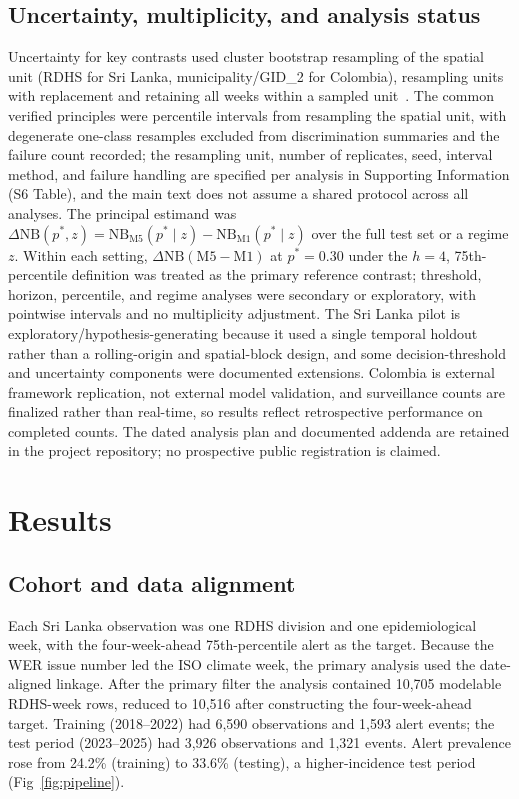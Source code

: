 \documentclass[11pt,a4paper]{article}
\begin{document}
\subsection{Uncertainty, multiplicity, and analysis status}
Uncertainty for key contrasts used cluster bootstrap resampling of the spatial unit (RDHS for Sri Lanka, municipality/GID\_2 for Colombia), resampling units with replacement and retaining all weeks within a sampled unit~\cite{CameronGelbachMiller2008}. The common verified principles were percentile intervals from resampling the spatial unit, with degenerate one-class resamples excluded from discrimination summaries and the failure count recorded; the resampling unit, number of replicates, seed, interval method, and failure handling are specified per analysis in Supporting Information (S6 Table), and the main text does not assume a shared protocol across all analyses. The principal estimand was $\Delta\mathrm{NB}(p^*,z)=\mathrm{NB}_{\mathrm{M5}}(p^*\mid z)-\mathrm{NB}_{\mathrm{M1}}(p^*\mid z)$ over the full test set or a regime $z$. Within each setting, $\Delta\mathrm{NB}(\text{M5}-\text{M1})$ at $p^*=0.30$ under the $h=4$, 75th-percentile definition was treated as the primary reference contrast; threshold, horizon, percentile, and regime analyses were secondary or exploratory, with pointwise intervals and no multiplicity adjustment. The Sri Lanka pilot is exploratory/hypothesis-generating because it used a single temporal holdout rather than a rolling-origin and spatial-block design, and some decision-threshold and uncertainty components were documented extensions. Colombia is external framework replication, not external model validation, and surveillance counts are finalized rather than real-time, so results reflect retrospective performance on completed counts. The dated analysis plan and documented addenda are retained in the project repository; no prospective public registration is claimed.

\section{Results}

\subsection{Cohort and data alignment}
Each Sri Lanka observation was one RDHS division and one epidemiological week, with the four-week-ahead 75th-percentile alert as the target. Because the WER issue number led the ISO climate week, the primary analysis used the date-aligned linkage. After the primary filter the analysis contained 10{,}705 modelable RDHS-week rows, reduced to 10{,}516 after constructing the four-week-ahead target. Training (2018--2022) had 6{,}590 observations and 1{,}593 alert events; the test period (2023--2025) had 3{,}926 observations and 1{,}321 events. Alert prevalence rose from 24.2\% (training) to 33.6\% (testing), a higher-incidence test period (Fig~\ref{fig:pipeline}).
\end{document}
